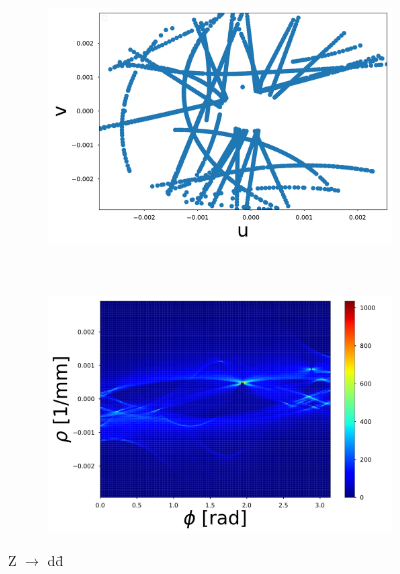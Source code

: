 \begin{figure}[ht]
\begin{subfigure}[b]{0.3\textwidth}
    \end{subfigure}
		~ %
		\begin{subfigure}[b]{0.3\textwidth}
					\includegraphics[width=\textwidth]{figures/CT_Zdd.pdf}
					\caption{}
			\end{subfigure}
			~ %
			\begin{subfigure}[b]{0.3\textwidth}
						\includegraphics[width=\textwidth]{figures/HT_Zdd.pdf}
						\caption{}
				\end{subfigure}
	\label{HTZdd}
	\caption{Z $\rightarrow$ d\={d}}
\end{figure}
